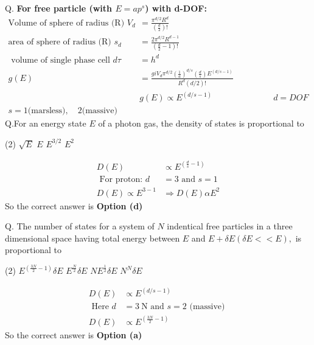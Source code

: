 Q. \textbf{For free particle (with $E=ap^s$) with d-DOF: }\\
\begin{align*}
\text{Volume of sphere of radius (R) }V_{d}&=\frac{\pi^{d / 2} R^{d}}{\left(\frac{d}{2}\right) !}\\
\text{area of sphere of radius (R) }s_{d}&=\frac{2 \pi^{d / 2} R^{d-1}}{\left(\frac{d}{2}-1\right) !}\\
\text{ volume of single phase cell }d \tau&=h^{d}\\
g(E)&=\frac{g i V_{d} \pi^{d / 2}\left(\frac{1}{a}\right)^{d / s}\left(\frac{d}{s}\right) E^{(d / s-1)}}{R^{d}(d / 2) !}\\
&g(E) \propto E^{(d / s-1)}\hspace{3cm}d=DOF\\
s=1 \text{(marsless)},\quad
2 \text{(massive)}
\end{align*}
Q.For an energy state $E$ of a photon gas, the density of states is proportional to 
 \begin{tasks}(2)
	\task[\textbf{a.}] $\sqrt{E}$
	\task[\textbf{b.}] $E $
	\task[\textbf{c.}]$E^{3 / 2}$
	\task[\textbf{d.}] $E^{2}$
\end{tasks}
\begin{answer}
	\begin{align*}
	D(E) &\propto E^{\left(\frac{d}{s}-1\right)}\\
	\text { For proton: } d&=3 \text { and } s=1\\
	D(E) \propto E^{3-1} &\Rightarrow D(E) \alpha E^{2}
	\end{align*}
		So the correct answer is \textbf{Option (d)}
\end{answer}
Q. The number of states for a system of $N$ indentical free particles in a three dimensional space having total energy between $E$ and $E+\delta E(\delta E<<E),$ is proportional to 
 \begin{tasks}(2)
	\task[\textbf{a.}]$E^{\left(\frac{3 N}{2}-1\right)} \delta E$
	\task[\textbf{b.}]$E^{\frac{N}{2}} \delta E$
	\task[\textbf{c.}]$N E^{\frac{1}{2}} \delta E$
	\task[\textbf{d.}]$N^{N} \delta E$ 
\end{tasks}
\begin{answer}
	\begin{align*}
	D(E) &\propto E^{(d / s-1)}\\
	\text { Here } d&=3 \mathrm{~N} \text { and } s=2 \text { (massive) }\\
	D(E) &\propto E^{\left(\frac{3 N}{2}-1\right)}
	\end{align*}
		So the correct answer is \textbf{Option (a)}
\end{answer}
